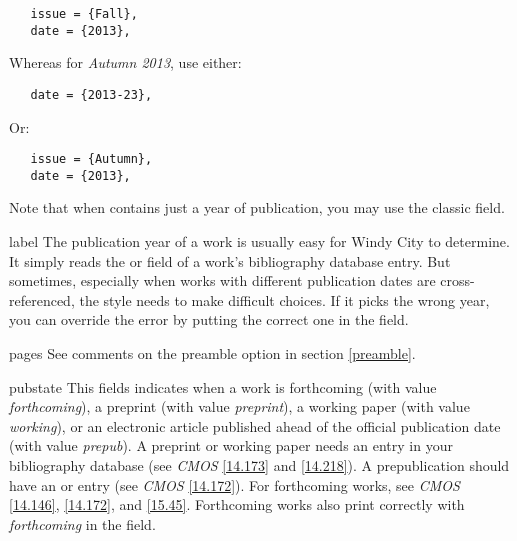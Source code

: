 \documentclass[11pt,letterpaper,oneside]{article}
\begin{document}
\begin{marglist}
\begin{verbatim}
   issue = {Fall},
   date = {2013},
\end{verbatim}

\noindent Whereas for \textit{Autumn 2013}, use either:

\begin{verbatim}
   date = {2013-23},
\end{verbatim}

\noindent Or:

\begin{verbatim}
   issue = {Autumn},
   date = {2013},
\end{verbatim}

\noindent Note that when  contains just a year of
publication, you may use the classic  field.

\item[label] The publication year of a work is usually easy for Windy
City to determine. It simply reads the  or
 field of a work's bibliography database entry. But
sometimes, especially when works with different publication dates are
cross-referenced, the style needs to make difficult choices. If it
picks the wrong year, you can override the error by putting the
correct one in the  field.

\item[pages] See comments on the  preamble option in
section \ref{preamble}.

\item[pubstate] This fields indicates when a work is forthcoming (with
value \textit{forthcoming}), a preprint (with value
\textit{preprint}), a working paper (with value \textit{working}), or
an electronic article published ahead of the official publication date
(with value \textit{prepub}). A preprint or working paper needs an
 entry in your bibliography database (see
\textit{CMOS} \ref{14.173} and \ref{14.218}). A prepublication should
have an  or  entry (see
\textit{CMOS} \ref{14.172}). For forthcoming works, see \textit{CMOS}
\ref{14.146}, \ref{14.172}, and \ref{15.45}. Forthcoming works also
print correctly with \textit{forthcoming} in the 
field.

\begin{bibonly}
\nocite{faraday,huang2015,jubb2015,lucki1980}
\end{bibonly}


\end{marglist}
\end{document}
